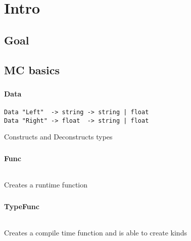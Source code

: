 \section{Intro}
\subsection{Goal}

\subsection{MC basics}
\begin{frame}[fragile]
   \frametitle{\subsecname}
   \framesubtitle{Data}

   \begin{lstlisting}
Data "Left"  -> string -> string | float
Data "Right" -> float  -> string | float
   \end{lstlisting}
   Constructs and Deconstructs types
\end{frame}
\begin{frame}[fragile]
   \frametitle{\subsecname}
   \framesubtitle{Func}

   \begin{lstlisting}

   \end{lstlisting}
   Creates a runtime function
\end{frame}
\begin{frame}[fragile]
   \frametitle{\subsecname}
   \framesubtitle{TypeFunc}

   \begin{lstlisting}

   \end{lstlisting}
   Creates a compile time function and is able to create kinds
\end{frame}
